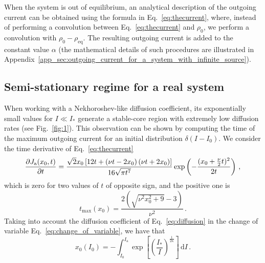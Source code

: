 When the system is out of equilibrium, an analytical description of the outgoing current can be obtained using the formula in Eq.~\eqref{eq:thecurrent}, where, instead of performing a convolution between Eq.~\eqref{eq:thecurrent} and $\rho_0$, we perform a convolution with $\rho_0 - \rho_\text{eq}$. The resulting outgoing current is added to the constant value $\alpha$ (the mathematical details of such procedures are illustrated in Appendix~\ref{app_sec:outgoing_current_for_a_system_with_infinite_source}).


\subsection{Semi-stationary regime for a real system}
\label{subsec:semi_stationary_regime_for_a_real_system}


When working with a Nekhoroshev-like diffusion coefficient, its exponentially small values for $I \ll I_\ast$ generate a stable-core region with extremely low diffusion rates (see Fig.~\ref{fig:1}). This observation can be shown by computing the time of the maximum outgoing current for an initial distribution $\delta(I - I_0)$. We consider the time derivative of Eq.~\eqref{eq:thecurrent}
\begin{equation}
\pdv{J_\mathrm{a}(x_0, t)}{t} = \frac{\sqrt{2} x_0 \left[12 t + \left(\nu t - 2 x_0\right) \left(\nu t + 2 x_0\right)\right] }{16 \sqrt{\pi t^7}}\exp\left(-\frac{(x_0+\frac{\nu}{2}t)^2}{2t}\right)\,,
\end{equation}
which is zero for two values of $t$ of opposite sign, and the positive one is
\begin{equation}
    t_{\text{max}}(x_0) = \frac{2 \left(\sqrt{\nu^{2} x_0^{2} + 9} - 3\right)}{\nu^{2}}\,.
    \label{eq:taumax}
\end{equation}
Taking into account the diffusion coefficient of Eq.~\eqref{eq:diffusion} in the change of variable Eq.~\eqref{eq:change_of_variable}, we have that
\begin{equation}
    x_0(I_0) = {-}\int_{I_0}^{I_\mathrm{a}} \exp\left[\left(\frac{I_\ast}{I}\right)^{\frac{1}{2\kappa}}\right]\,\mathrm{d}I\,.
    \label{eq:peak_current_time}
\end{equation}

